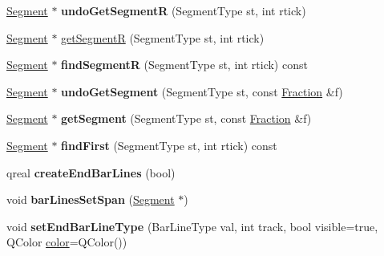 \begin{DoxyCompactItemize}
\hyperlink{class_ms_1_1_segment}{Segment} $\ast$ {\bfseries undo\+Get\+SegmentR} (Segment\+Type st, int rtick)
\item 
\hyperlink{class_ms_1_1_segment}{Segment} $\ast$ \hyperlink{class_ms_1_1_measure_ad245c1b7912df13ee99f673c4cf69045}{get\+SegmentR} (Segment\+Type st, int rtick)
\item 
\mbox{\label{class_ms_1_1_measure_a1e4f149dae3b266adee92568fe32ea8a}} 
\hyperlink{class_ms_1_1_segment}{Segment} $\ast$ {\bfseries find\+SegmentR} (Segment\+Type st, int rtick) const
\item 
\mbox{\label{class_ms_1_1_measure_ab6c8d20b57a9c8e72e75684687932777}} 
\hyperlink{class_ms_1_1_segment}{Segment} $\ast$ {\bfseries undo\+Get\+Segment} (Segment\+Type st, const \hyperlink{class_ms_1_1_fraction}{Fraction} \&f)
\item 
\mbox{\label{class_ms_1_1_measure_aaf57616b83ee061e69f26e2b75fb2d87}} 
\hyperlink{class_ms_1_1_segment}{Segment} $\ast$ {\bfseries get\+Segment} (Segment\+Type st, const \hyperlink{class_ms_1_1_fraction}{Fraction} \&f)
\item 
\mbox{\label{class_ms_1_1_measure_a438c06539f8cb4c94127dfa4fbe28dc2}} 
\hyperlink{class_ms_1_1_segment}{Segment} $\ast$ {\bfseries find\+First} (Segment\+Type st, int rtick) const
\item 
\mbox{\label{class_ms_1_1_measure_aa910bff7edd9435bd775b373f6010b34}} 
qreal {\bfseries create\+End\+Bar\+Lines} (bool)
\item 
\mbox{\label{class_ms_1_1_measure_afa5c4d44781f40f962d4818271f60249}} 
void {\bfseries bar\+Lines\+Set\+Span} (\hyperlink{class_ms_1_1_segment}{Segment} $\ast$)
\item 
\mbox{\label{class_ms_1_1_measure_a494ef46ba1ca13806d6b7ea8868309e1}} 
void {\bfseries set\+End\+Bar\+Line\+Type} (Bar\+Line\+Type val, int track, bool visible=true, Q\+Color \hyperlink{structcolor}{color}=Q\+Color())
\item 
\mbox{\label{class_ms_1_1_measure_a9233f4c1eddd966b5be006bc7f2ba06c}} 

\end{DoxyCompactItemize}
